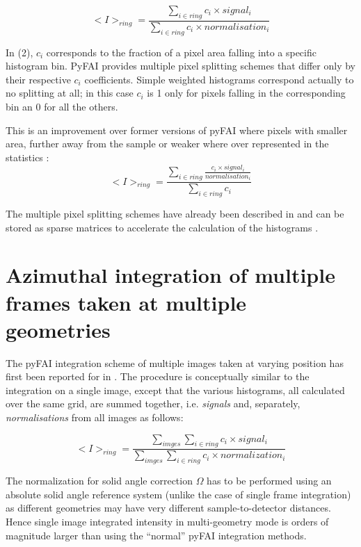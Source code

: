 \documentclass[preprint, pdf]{iucr}              %
\begin{document}
\begin{equation}
<I>_{ring} = \frac{\sum\limits_{i \in ring} c_i \times signal_i}
                  {\sum\limits_{i \in ring} c_i \times normalisation_i} 
\end{equation}

In (2), $c_i$ corresponds to the fraction of a pixel area 
falling into a specific histogram bin. 
PyFAI provides multiple pixel splitting schemes that differ only by their
respective $c_i$ coefficients. 
Simple weighted histograms correspond actually to no splitting at all; in this
case $c_i$ is 1 only for pixels falling in the corresponding bin an 0 for all
the others.

This is an improvement over former versions of pyFAI where pixels with
smaller area, further away from the sample or weaker where over represented in
the statistics :
\begin{equation}
<I>_{ring} = \frac{\sum\limits_{i \in ring} \frac{ c_i \times
signal_i}{normalisation_i}} {\sum\limits_{i \in ring} c_i} 
\end{equation}

The multiple pixel splitting schemes have already been described in
  and can be stored as sparse matrices to accelerate the
 calculation of the histograms  \cite{kieffer_ashiotis-proc-euroscipy-2014}.

\section{Azimuthal integration of multiple frames taken at multiple geometries}

The pyFAI integration scheme of multiple images taken at varying position has
first been reported for  in  \cite{PyFAI_PDJ}. 
The procedure is conceptually similar to the integration on a single image,
except that the various histograms, all calculated over the same
grid, are summed together, i.e. \textit{signals} and, separately, 
\textit{normalisations} from all images as follows: 

\begin{equation}
<I>_{ring} = \frac{\sum\limits_{imges} \sum\limits_{i \in ring} c_i \times
signal_i} {\sum\limits_{imges} \sum\limits_{i \in ring} c_i \times
normalization_i} 
\end{equation}

The normalization for solid angle correction $\Omega$ has to be performed
using an absolute solid angle reference system (unlike the case of single
frame integration) as different geometries may have very different
sample-to-detector distances.
Hence single image integrated intensity in multi-geometry mode is orders of
magnitude larger than using the ``normal'' pyFAI integration methods.
\end{document}
